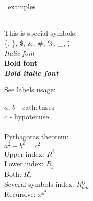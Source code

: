 \documentclass[12pt]{letter}
\begin{document}
\begin{center}

\Huge{\LaTeXe\ examples} \\\

\end{center}


\LARGE{

This is special symbols: \\
\{, \}, \$, \&, \#, \%, \_, \",\^ \\ 

{\slshape Italic\label{fonts} font} \\
{\bfseries Bold font} \\
{{\slshape \bfseries Bold italic font} } \\

}

\large{
See labels usage:~\pageref{fonts} \\
}

\large{
$a$, $b$ - cathetuses \\
$c$ - hypotenuse \\\\
Pythagoras theorem: \\
$a^2 + b^2 = c^2$ \\

Upper index: $R^i$ \\
Lower index: $R_j$ \\
Both: $R^i_j$ \\
Several symbols index: $R^{ij}_{km}$ \\
Recursive: $x^{y^3}$
}

\newpage
\end{document}

